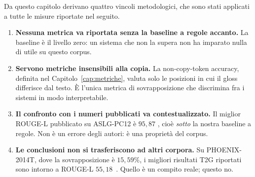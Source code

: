 Da questo capitolo derivano quattro vincoli metodologici, che sono stati
applicati a tutte le misure riportate nel seguito.

\begin{enumerate}
  \item \textbf{Nessuna metrica va riportata senza la baseline a regole
        accanto.} La baseline è il livello zero: un sistema che non la supera
        non ha imparato nulla di utile su questo corpus.
  \item \textbf{Servono metriche insensibili alla copia.} La
        non-copy-token accuracy, definita nel Capitolo~\ref{cap:metriche},
        valuta solo le posizioni in cui il gloss differisce dal testo. È l'unica
        metrica di sovrapposizione che discrimina fra i sistemi in modo
        interpretabile.
  \item \textbf{Il confronto con i numeri pubblicati va contestualizzato.} Il
        miglior ROUGE-L pubblicato su ASLG-PC12 è $95{,}87$
        \cite{peng2023monolingual}, cioè \emph{sotto} la nostra baseline a
        regole. Non è un errore degli autori: è una proprietà del corpus.
  \item \textbf{Le conclusioni non si trasferiscono ad altri corpora.} Su
        PHOENIX-2014T, dove la sovrapposizione è $15{,}59\%$, i migliori
        risultati T2G riportati sono intorno a ROUGE-L
        $55{,}18$~\cite{ouargani2023t2g}. Quello è un compito reale; questo no.
\end{enumerate}
